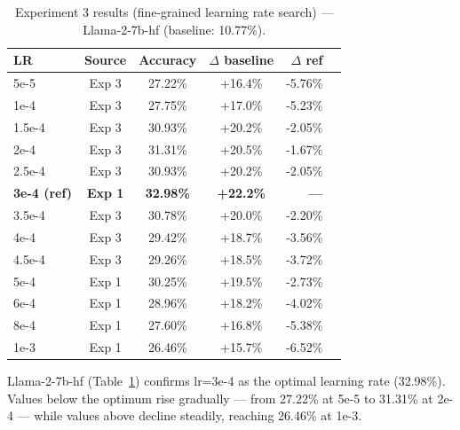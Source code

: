   \begin{table}[ht]
  \caption{Experiment 3 results (fine-grained learning rate search) --- Llama-2-7b-hf (baseline: 10.77\%).}
  \centering
  \footnotesize
  \begin{tabular}{lcccrr}
  \toprule
  \textbf{LR} & \textbf{Source} & \textbf{Accuracy} & \textbf{$\Delta$ baseline} & \textbf{$\Delta$ ref} \\
  \midrule
  5e-5  & Exp 3 & 27.22\% & +16.4\% & -5.76\% \\
  1e-4  & Exp 3 & 27.75\% & +17.0\% & -5.23\% \\
  1.5e-4 & Exp 3 & 30.93\% & +20.2\% & -2.05\% \\
  2e-4  & Exp 3 & 31.31\% & +20.5\% & -1.67\% \\
  2.5e-4 & Exp 3 & 30.93\% & +20.2\% & -2.05\% \\
  \textbf{3e-4 (ref)} & \textbf{Exp 1} & \textbf{32.98\%} & \textbf{+22.2\%} & \textbf{---} \\
  3.5e-4 & Exp 3 & 30.78\% & +20.0\% & -2.20\% \\
  4e-4  & Exp 3 & 29.42\% & +18.7\% & -3.56\% \\
  4.5e-4 & Exp 3 & 29.26\% & +18.5\% & -3.72\% \\
  5e-4  & Exp 1 & 30.25\% & +19.5\% & -2.73\% \\
  6e-4  & Exp 1 & 28.96\% & +18.2\% & -4.02\% \\
  8e-4  & Exp 1 & 27.60\% & +16.8\% & -5.38\% \\
  1e-3  & Exp 1 & 26.46\% & +15.7\% & -6.52\% \\
  \bottomrule
  \end{tabular}

  \label{tab:exp3-llama-hf}
  \end{table}

  Llama-2-7b-hf (Table~\ref{tab:exp3-llama-hf}) confirms
  lr=3e-4 as the optimal learning rate (32.98\%). Values below the optimum rise
  gradually --- from 27.22\% at 5e-5 to 31.31\% at
  2e-4 --- while values above decline steadily, reaching
  26.46\% at 1e-3.

